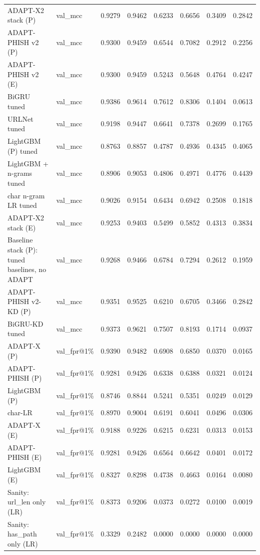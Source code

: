 \begin{table}[t]
\begin{tabular}{llrrrrrr}
ADAPT-X2 stack (P) & val\_mcc & 0.9279 & 0.9462 & 0.6233 & 0.6656 & 0.3409 & 0.2842 \\
ADAPT-PHISH v2 (P) & val\_mcc & 0.9300 & 0.9459 & 0.6544 & 0.7082 & 0.2912 & 0.2256 \\
ADAPT-PHISH v2 (E) & val\_mcc & 0.9300 & 0.9459 & 0.5243 & 0.5648 & 0.4764 & 0.4247 \\
BiGRU tuned & val\_mcc & 0.9386 & 0.9614 & 0.7612 & 0.8306 & 0.1404 & 0.0613 \\
URLNet tuned & val\_mcc & 0.9198 & 0.9447 & 0.6641 & 0.7378 & 0.2699 & 0.1765 \\
LightGBM (P) tuned & val\_mcc & 0.8763 & 0.8857 & 0.4787 & 0.4936 & 0.4345 & 0.4065 \\
LightGBM + n-grams tuned & val\_mcc & 0.8906 & 0.9053 & 0.4806 & 0.4971 & 0.4776 & 0.4439 \\
char n-gram LR tuned & val\_mcc & 0.9026 & 0.9154 & 0.6434 & 0.6942 & 0.2508 & 0.1818 \\
ADAPT-X2 stack (E) & val\_mcc & 0.9253 & 0.9403 & 0.5499 & 0.5852 & 0.4313 & 0.3834 \\
Baseline stack (P): tuned baselines, no ADAPT & val\_mcc & 0.9268 & 0.9466 & 0.6784 & 0.7294 & 0.2612 & 0.1959 \\
ADAPT-PHISH v2-KD (P) & val\_mcc & 0.9351 & 0.9525 & 0.6210 & 0.6705 & 0.3466 & 0.2842 \\
BiGRU-KD tuned & val\_mcc & 0.9373 & 0.9621 & 0.7507 & 0.8193 & 0.1714 & 0.0937 \\
ADAPT-X (P) & val\_fpr@1\% & 0.9390 & 0.9482 & 0.6908 & 0.6850 & 0.0370 & 0.0165 \\
ADAPT-PHISH (P) & val\_fpr@1\% & 0.9281 & 0.9426 & 0.6338 & 0.6388 & 0.0321 & 0.0124 \\
LightGBM (P) & val\_fpr@1\% & 0.8746 & 0.8844 & 0.5241 & 0.5351 & 0.0249 & 0.0129 \\
char-LR & val\_fpr@1\% & 0.8970 & 0.9004 & 0.6191 & 0.6041 & 0.0496 & 0.0306 \\
ADAPT-X (E) & val\_fpr@1\% & 0.9188 & 0.9226 & 0.6215 & 0.6231 & 0.0313 & 0.0153 \\
ADAPT-PHISH (E) & val\_fpr@1\% & 0.9281 & 0.9426 & 0.6564 & 0.6642 & 0.0401 & 0.0172 \\
LightGBM (E) & val\_fpr@1\% & 0.8327 & 0.8298 & 0.4738 & 0.4663 & 0.0164 & 0.0080 \\
Sanity: url\_len only (LR) & val\_fpr@1\% & 0.8373 & 0.9206 & 0.0373 & 0.0272 & 0.0100 & 0.0019 \\
Sanity: has\_path only (LR) & val\_fpr@1\% & 0.3329 & 0.2482 & 0.0000 & 0.0000 & 0.0000 & 0.0000 \\

\end{tabular}
\end{table}
